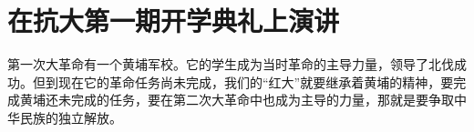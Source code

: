 \section[在抗大第一期开学典礼上演讲（一九三六年六月一日）]{在抗大第一期开学典礼上演讲}


第一次大革命有一个黄埔军校。它的学生成为当时革命的主导力量，领导了北伐成功。但到现在它的革命任务尚未完成，我们的“红大”就要继承着黄埔的精神，要完成黄埔还未完成的任务，要在第二次大革命中也成为主导的力量，那就是要争取中华民族的独立解放。

